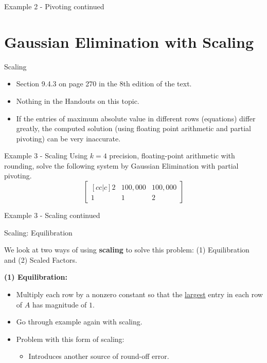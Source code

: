 \documentclass[12pt]{beamer}
\begin{document}
\begin{frame}{Example 2 - Pivoting continued}


\end{frame}


\section{Gaussian Elimination with Scaling}

\begin{frame}{Scaling}

\begin{itemize}
\item{Section 9.4.3 on page 270 in the 8th edition of the text.}
\item{Nothing in the Handouts on this topic.}
\item{If the entries of maximum absolute value in different rows (equations) differ greatly, the computed solution (using floating point arithmetic and partial pivoting) can be very inaccurate.}
\end{itemize}

\end{frame}

\begin{frame}{Example 3 - Scaling}
Using $k=4$ precision, floating-point arithmetic with rounding, solve the following system by Gaussian Elimination with partial pivoting.
\[
\begin{bmatrix}[cc|c]
  2  &  100,000 & 100,000 \\
  1  &  1  &  2
\end{bmatrix}
\]
\vspace{2 in}

\end{frame}

\begin{frame}{Example 3 - Scaling continued}


\end{frame}

\begin{frame}{Scaling: Equilibration}

We look at two ways of using {\bf scaling} to solve this problem: (1) Equilibration and (2) Scaled Factors.

\vspace{\baselineskip}
{\bf (1) Equilibration:}
\begin{itemize}
\item{Multiply each row by a nonzero constant so that the \underline{largest} entry in each row of $A$ has magnitude of $1$.}
\item{Go through example again with scaling.}
\item{Problem with this form of scaling:}
\begin{itemize}
\item{Introduces another source of round-off error.}
\end{itemize}
\end{itemize}

\end{frame}
\end{document}
